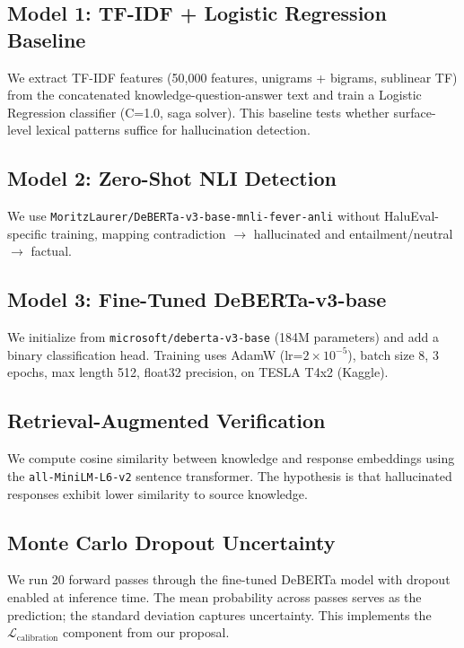 \documentclass[11pt]{article}
\begin{document}
\subsection{Model 1: TF-IDF + Logistic Regression Baseline}

We extract TF-IDF features (50,000 features, unigrams + bigrams, sublinear TF) from the concatenated knowledge-question-answer text and train a Logistic Regression classifier (C=1.0, saga solver). This baseline tests whether surface-level lexical patterns suffice for hallucination detection.

\subsection{Model 2: Zero-Shot NLI Detection}

We use \texttt{MoritzLaurer/DeBERTa-v3-base-mnli-fever-anli} without HaluEval-specific training, mapping contradiction $\rightarrow$ hallucinated and entailment/neutral $\rightarrow$ factual.

\subsection{Model 3: Fine-Tuned DeBERTa-v3-base}

We initialize from \texttt{microsoft/deberta-v3-base} (184M parameters) and add a binary classification head. Training uses AdamW (lr=$2 \times 10^{-5}$), batch size 8, 3 epochs, max length 512, float32 precision, on TESLA T4x2 (Kaggle).

\subsection{Retrieval-Augmented Verification}

We compute cosine similarity between knowledge and response embeddings using the \texttt{all-MiniLM-L6-v2} sentence transformer. The hypothesis is that hallucinated responses exhibit lower similarity to source knowledge.

\subsection{Monte Carlo Dropout Uncertainty}

We run 20 forward passes through the fine-tuned DeBERTa model with dropout enabled at inference time. The mean probability across passes serves as the prediction; the standard deviation captures uncertainty. This implements the $\mathcal{L}_{\text{calibration}}$ component from our proposal.
\end{document}
